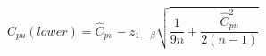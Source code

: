 

\[
C_{pu}(lower) = \hat{C}_{pu} - z_{1-\beta}\sqrt{\frac{1}{9n} + \frac{\hat{C}_{pu}^{2}}{2(n-1)}}
\]


